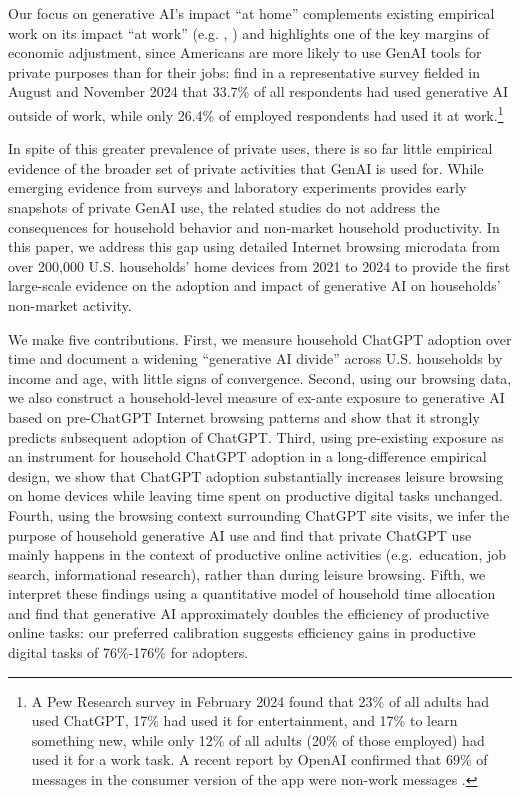 \documentclass[12pt]{article}
\begin{document}
Our focus on generative AI's impact ``at home'' complements existing empirical work on its impact ``at work'' (e.g. \cite{brynjolfsson2023}, \cite{yotzov_firm_2026}) and highlights one of the key margins of economic adjustment, since Americans are more likely to use GenAI tools for private purposes than for their jobs: \cite{bick2024} find in a representative survey fielded in August and November 2024 that 33.7\% of all respondents had used generative AI outside of work, while only 26.4\% of employed respondents had used it at work.\footnote{A Pew Research survey in February 2024 found that 23\% of all adults had used ChatGPT, 17\% had used it for entertainment, and 17\% to learn something new, while only 12\% of all adults (20\% of those employed) had used it for a work task. A recent report by OpenAI confirmed that 69\% of messages in the consumer version of the app were non-work messages \citep{openai2026}.} 

In spite of this greater prevalence of private uses, there is so far little empirical evidence of the broader set of private activities that GenAI is used for.  While emerging evidence from surveys and laboratory experiments provides early snapshots of private GenAI use, the related studies do not address the consequences for household behavior and non-market household productivity. In this paper, we address this gap using detailed Internet browsing microdata from over 200{,}000 U.S. households’ home devices from 2021 to 2024 to provide the first large-scale evidence on the adoption and impact of generative AI on households' non-market activity. 

We make five contributions. First, we measure household ChatGPT adoption over time and document a widening ``generative AI divide'' across U.S. households by income and age, with little signs of convergence. Second, using our browsing data, we also construct a household-level measure of ex-ante exposure to generative AI based on pre-ChatGPT Internet browsing patterns and show that it strongly predicts subsequent adoption of ChatGPT. Third, using pre-existing exposure as an instrument for household ChatGPT adoption in a long-difference empirical design, we show that ChatGPT adoption substantially increases leisure browsing on home devices while leaving time spent on productive digital tasks unchanged. Fourth, using the browsing context surrounding ChatGPT site visits, we infer the purpose of household generative AI use and find that private ChatGPT use mainly happens in the context of productive online activities (e.g.\ education, job search, informational research), rather than during leisure browsing. Fifth, we interpret these findings using a quantitative model of household time allocation and find that generative AI approximately doubles the efficiency of productive online tasks:  our preferred calibration suggests efficiency gains in productive digital tasks of 76\%-176\% for adopters.
\end{document}
